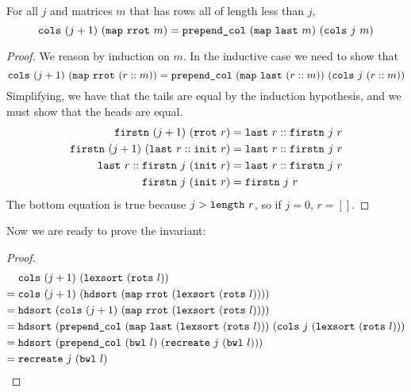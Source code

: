 \documentclass[sigplan,10pt,anonymous,review]{thesis}
\begin{document}
\begin{theorem}
  For all $j$ and matrices $m$ that has rows all of length less than $j$,
  \begin{equation*}
    \texttt{\textup{cols}}~(j+1)~(\texttt{\textup{map}}~\texttt{\textup{rrot}}~m) =
    \texttt{\textup{prepend\_col}}~(\texttt{\textup{map}}~\texttt{\textup{last}}~m)~(\texttt{\textup{cols}}~j~m)
  \end{equation*}
\end{theorem}
\begin{proof}
  We reason by induction on $m$. In the inductive case we need to show that
  \begin{equation*}
    \texttt{\textup{cols}}~(j+1)~(\texttt{\textup{map}}~\texttt{\textup{rrot}}~(r::m)) =
    \texttt{\textup{prepend\_col}}~(\texttt{\textup{map}}~\texttt{\textup{last}}~(r::m))~(\texttt{\textup{cols}}~j~(r::m))
  \end{equation*}
  Simplifying, we have that the tails are equal by the induction
  hypothesis, and we must show that the heads are equal.
  \begin{align*}
    \texttt{\textup{firstn}}~(j+1)~(\texttt{\textup{rrot}}~r) &= \texttt{\textup{last}}~r :: \texttt{\textup{firstn}}~j~r \\
    \texttt{\textup{firstn}}~(j+1)~(\texttt{\textup{last}}~r :: \texttt{\textup{init}}~r) &= \texttt{\textup{last}}~r
    :: \texttt{\textup{firstn}}~j~r \\
    \texttt{\textup{last}}~r :: \texttt{\textup{firstn}}~j~(\texttt{\textup{init}}~r) &= \texttt{\textup{last}}~r :: \texttt{\textup{firstn}}~j~r \\
    \texttt{\textup{firstn}}~j~(\texttt{\textup{init}}~r) &= \texttt{\textup{firstn}}~j~r
  \end{align*}
  The bottom equation is true because $j > \texttt{\textup{length}}~r$, so if $j=
  0$, $r = []$.
\end{proof}

Now we are ready to prove the invariant:
\recreatecorrectinv
\begin{proof}
\begin{align*}
  &\texttt{\textup{cols}}~(j+1)~(\texttt{\textup{lexsort}}~(\texttt{\textup{rots}}~l)) \\
={}& \texttt{\textup{cols}}~(j+1)~(\texttt{\textup{hdsort}}~(\texttt{\textup{map}}~\texttt{\textup{rrot}}~(\texttt{\textup{lexsort}}~(\texttt{\textup{rots}}~l)))) \\
={}&
\texttt{\textup{hdsort}}~(\texttt{\textup{cols}}~(j+1)~(\texttt{\textup{map}}~\texttt{\textup{rrot}}~(\texttt{\textup{lexsort}}~(\texttt{\textup{rots}}~l)))) \\
={}&
\texttt{\textup{hdsort}}~(\texttt{\textup{prepend\_col}}~(\texttt{\textup{map}}~\texttt{\textup{last}}~(\texttt{\textup{lexsort}}~(\texttt{\textup{rots}}~l)))~(\texttt{\textup{cols}}~j~(\texttt{\textup{lexsort}}~(\texttt{\textup{rots}}~l))) \\
={}&
\texttt{\textup{hdsort}}~(\texttt{\textup{prepend\_col}}~(\texttt{\textup{bwl}}~l)~(\texttt{\textup{recreate}}~j~(\texttt{\textup{bwl}}~l))) \\
={}& \texttt{\textup{recreate}}~j~(\texttt{\textup{bwl}}~l) \qedhere
\end{align*}
\end{proof}
\end{document}
